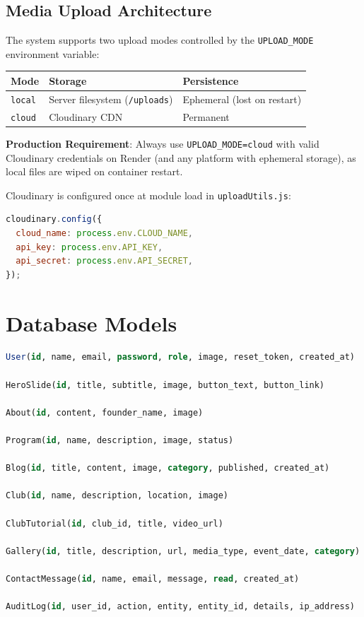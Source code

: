 \documentclass[12pt,a4paper]{article}
\begin{document}
\subsection{Media Upload Architecture}
The system supports two upload modes controlled by the \texttt{UPLOAD\_MODE} environment variable:

\begin{center}
\begin{tabular}{lll}
\toprule
Mode & Storage & Persistence \\
\midrule
\texttt{local} & Server filesystem (\texttt{/uploads}) & Ephemeral (lost on restart) \\
\texttt{cloud} & Cloudinary CDN & Permanent \\
\bottomrule
\end{tabular}
\end{center}

\textbf{Production Requirement}: Always use \texttt{UPLOAD\_MODE=cloud} with valid Cloudinary credentials on Render (and any platform with ephemeral storage), as local files are wiped on container restart.

Cloudinary is configured once at module load in \texttt{uploadUtils.js}:
\begin{lstlisting}[language=JavaScript]
cloudinary.config({
  cloud_name: process.env.CLOUD_NAME,
  api_key: process.env.API_KEY,
  api_secret: process.env.API_SECRET,
});
\end{lstlisting}


\section{Database Models}

\begin{lstlisting}[language=SQL]
User(id, name, email, password, role, image, reset_token, created_at)

HeroSlide(id, title, subtitle, image, button_text, button_link)

About(id, content, founder_name, image)

Program(id, name, description, image, status)

Blog(id, title, content, image, category, published, created_at)

Club(id, name, description, location, image)

ClubTutorial(id, club_id, title, video_url)

Gallery(id, title, description, url, media_type, event_date, category)

ContactMessage(id, name, email, message, read, created_at)

AuditLog(id, user_id, action, entity, entity_id, details, ip_address)
\end{lstlisting}
\end{document}
